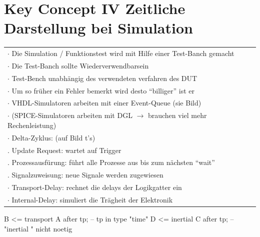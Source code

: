 
\newpage

\section{Key Concept IV \tiny Zeitliche Darstellung bei Simulation}

\begin{minipage}{0.6\textwidth}
	\begin{tabular}{l}
		$\cdot$ Die Simulation / Funktionstest wird mit Hilfe einer Test-Banch gemacht \\
		$\cdot$ Die Test-Banch sollte Wiederverwendbarsein \\
		$\cdot$ Test-Bench unabhängig des verwendeten verfahren des DUT \\
		$\cdot$ Um so früher ein Fehler bemerkt wird desto "`billiger"' ist er  \\
		$\cdot$ VHDL-Simulatoren arbeiten mit einer Event-Queue (sie Bild) \\
		$\cdot$ (SPICE-Simulatoren arbeiten mit DGL {\tiny $\rightarrow$ brauchen viel mehr Rechenleistung}) \\
		$\cdot$ Delta-Zyklus: (auf Bild t's) \\
		\qquad 1. Update Request: \qquad wartet auf Trigger\\
		\qquad 2. Prozessausfürung: \quad führt alle Prozesse aus {\tiny bis zum nächsten "`wait"'}\\
		\qquad 3. Signalzuweisung: \qquad neue Signale werden zugewiesen\\
		$\cdot$ Transport-Delay: rechnet die delays der Logikgatter ein \\
		$\cdot$ Internal-Delay: simuliert die Trägheit der Elektronik \\
	\end{tabular}
	
	\begin{minipage}{0.04\textwidth}
		\text{ } %
	\end{minipage}
	\begin{minipage}{0.9\textwidth}
		\begin{VHDL}
B <= transport A after tp; 		-- tp in type "time"
D <= inertial C after tp;  		-- "inertial " nicht noetig\end{VHDL}
	\end{minipage}
	
\end{minipage}
